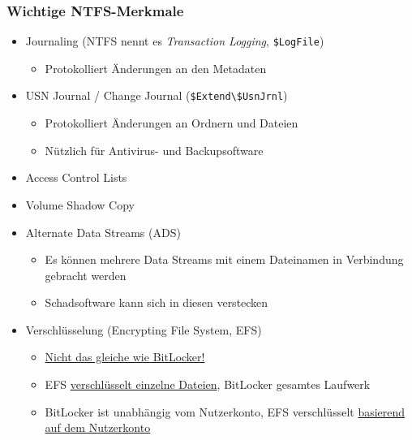 \subsubsection{Wichtige NTFS-Merkmale}
\begin{itemize}
    \item Journaling (NTFS nennt es \textit{Transaction Logging}, \lstinline|$LogFile|)
    \begin{itemize}
        \item Protokolliert Änderungen an den Metadaten
    \end{itemize}
    \item USN Journal / Change Journal (\lstinline|$Extend\$UsnJrnl|)
    \begin{itemize}
        \item Protokolliert Änderungen an Ordnern und Dateien
        \item Nützlich für Antivirus- und Backupsoftware
    \end{itemize}
    \item Access Control Lists
    \item Volume Shadow Copy
    \item Alternate Data Streams (ADS)
    \begin{itemize}
        \item Es können mehrere Data Streams mit einem Dateinamen in Verbindung gebracht werden
        \item Schadsoftware kann sich in diesen verstecken
    \end{itemize}
    \item Verschlüsselung (Encrypting File System, EFS)
    \begin{itemize}
        \item \underline{Nicht das gleiche wie BitLocker!}
        \item EFS \underline{verschlüsselt einzelne Dateien}, BitLocker gesamtes Laufwerk
        \item BitLocker ist unabhängig vom Nutzerkonto, EFS verschlüsselt \underline{basierend auf dem Nutzerkonto}
    \end{itemize}
\end{itemize}

